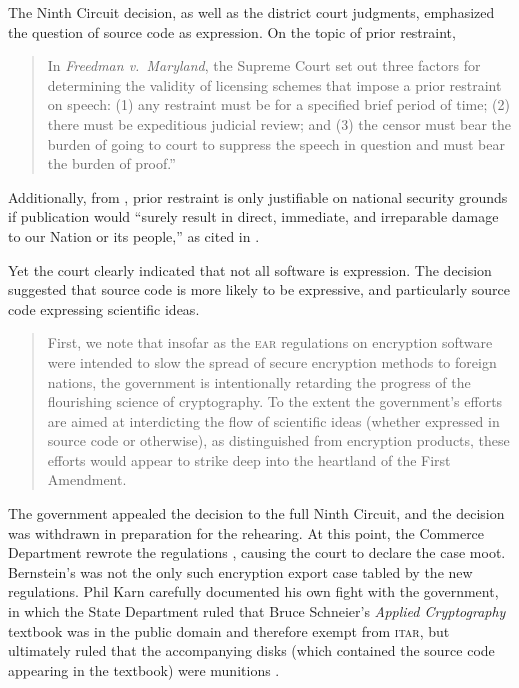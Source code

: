 \documentclass[12pt]{olfmemo}
\begin{document}
The Ninth Circuit decision, as well as the district court judgments, emphasized the question of source code as expression. On the topic of prior restraint,
\begin{quote}
In \textit{Freedman v.\ Maryland}, the Supreme Court set out three factors for determining the validity of licensing schemes that impose a prior restraint on speech: (1) any restraint must be for a specified brief period of time; (2) there must be expeditious judicial review; and (3) the censor must bear the burden of going to court to suppress the speech in question and must bear the burden of proof.''%
\citep[p.~4239]{Bernstein1997}
\end{quote}
Additionally, from , prior restraint is only justifiable on national security grounds if publication would ``surely result in direct, immediate, and irreparable damage to our Nation or its people,'' \citep{NYTvUS} as cited in .

Yet the court clearly indicated that not all software is expression. The decision suggested that source code is more likely to be expressive, and particularly source code expressing scientific ideas.
\begin{quote}
First, we note that insofar as the \textsc{ear} regulations on encryption software were intended to slow the spread of secure encryption methods to foreign nations, the government is intentionally retarding the progress of the flourishing science of cryptography. To the extent the government's efforts are aimed at interdicting the flow of scientific ideas (whether expressed in source code or otherwise), as distinguished from encryption products, these efforts would appear to strike deep into the heartland of the First Amendment. \citep[p.~4242]{Bernstein1997}
\end{quote}

The government appealed the decision to the full Ninth Circuit, and the  decision was withdrawn in preparation for the rehearing. At this point, the Commerce Department rewrote the regulations \citep{EncryptionRule2000}, causing the court to declare the case moot. Bernstein's was not the only such encryption export case tabled by the new regulations. Phil Karn carefully documented his own fight with the government, in which the State Department ruled that Bruce Schneier's \textit{Applied Cryptography} textbook was in the public domain and therefore exempt from \textsc{itar}, but ultimately ruled that the accompanying disks (which contained the source code appearing in the textbook) were munitions \citep{Karn1999}.
\end{document}

